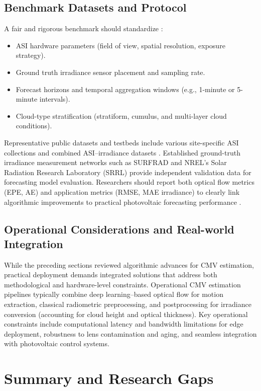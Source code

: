 \subsection{Benchmark Datasets and Protocol}
A fair and rigorous benchmark should standardize \cite{baker2011,nie2024}:
\begin{itemize}
  \item ASI hardware parameters (field of view, spatial resolution, exposure strategy).
  \item Ground truth irradiance sensor placement and sampling rate.
  \item Forecast horizons and temporal aggregation windows (e.g., 1-minute or 5-minute intervals).
  \item Cloud-type stratification (stratiform, cumulus, and multi-layer cloud conditions).
\end{itemize}

Representative public datasets and testbeds include various site-specific ASI collections and combined ASI--irradiance datasets \cite{urquhart2016,qin2022cloudcast,nouri2021skycam,nie2024}. Established ground-truth irradiance measurement networks such as SURFRAD \cite{augustine2000} and NREL's Solar Radiation Research Laboratory (SRRL) \cite{stoffel1981} provide independent validation data for forecasting model evaluation. Researchers should report both optical flow metrics (EPE, AE) and application metrics (RMSE, MAE irradiance) to clearly link algorithmic improvements to practical photovoltaic forecasting performance \cite{yang2020,logothetis2022}.

\subsection{Operational Considerations and Real-world Integration}
While the preceding sections reviewed algorithmic advances for CMV estimation, practical deployment demands integrated solutions that address both methodological and hardware-level constraints.
Operational CMV estimation pipelines typically combine deep learning--based optical flow for motion extraction, classical radiometric preprocessing, and postprocessing for irradiance conversion (accounting for cloud height and optical thickness). Key operational constraints include computational latency and bandwidth limitations for edge deployment, robustness to lens contamination and aging, and seamless integration with photovoltaic control systems.

\section{Summary and Research Gaps}

